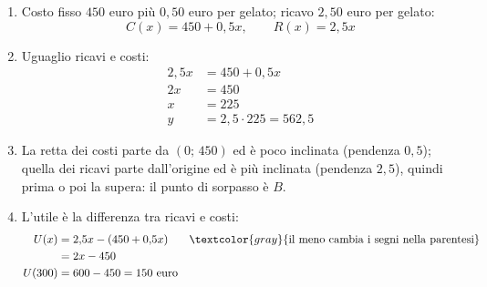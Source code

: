 \begin{question}[ID=4.2, subtitle={Break-even di un carretto dei gelati}, difficulty=media, tags={sistemi, break-even, grafici}]
\begin{explanation}
\begin{enumerate}[label=\alph*),leftmargin=1.8cm]
    \item Costo fisso $450$ euro più $0{,}50$ euro per gelato; ricavo $2{,}50$ euro per gelato:
    \[ C(x)=450+0{,}5x, \qquad R(x)=2{,}5x \]
    \item Uguaglio ricavi e costi:
    \[\begin{aligned}
    2{,}5x &= 450+0{,}5x\\
    2x &= 450\\
    x &= 225\\
    y &= 2{,}5\cdot225=562{,}5
    \end{aligned}\]
    \item La retta dei costi parte da $(0;\,450)$ ed è poco inclinata (pendenza $0{,}5$); quella dei ricavi parte dall'origine ed è più inclinata (pendenza $2{,}5$), quindi prima o poi la supera: il punto di sorpasso è $B$.
    \item L'utile è la differenza tra ricavi e costi:
    \[\begin{aligned}
    U(x) &= 2{,}5x-(450+0{,}5x) && \textcolor{gray}{\text{il meno cambia i segni nella parentesi}}\\
    &= 2x-450\\
    U(300) &= 600-450=150 \text{ euro}
    \end{aligned}\]
\end{enumerate}
\end{explanation}
\end{question}


